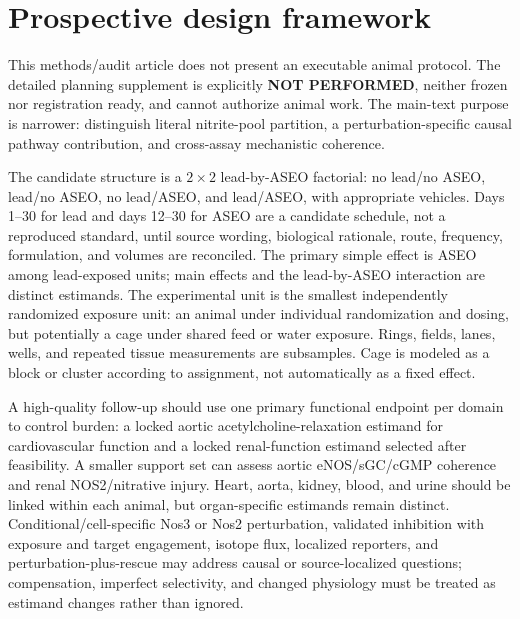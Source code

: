 \documentclass[11pt]{article}
\begin{document}
\section{Prospective design framework}

This methods/audit article does not present an executable animal protocol. The detailed planning supplement is explicitly \textbf{NOT PERFORMED}, neither frozen nor registration ready, and cannot authorize animal work. The main-text purpose is narrower: distinguish literal nitrite-pool partition, a perturbation-specific causal pathway contribution, and cross-assay mechanistic coherence.

The candidate structure is a $2\times2$ lead-by-ASEO factorial: no lead/no ASEO, lead/no ASEO, no lead/ASEO, and lead/ASEO, with appropriate vehicles. Days 1--30 for lead and days 12--30 for ASEO are a candidate schedule, not a reproduced standard, until source wording, biological rationale, route, frequency, formulation, and volumes are reconciled. The primary simple effect is ASEO among lead-exposed units; main effects and the lead-by-ASEO interaction are distinct estimands. The experimental unit is the smallest independently randomized exposure unit: an animal under individual randomization and dosing, but potentially a cage under shared feed or water exposure. Rings, fields, lanes, wells, and repeated tissue measurements are subsamples. Cage is modeled as a block or cluster according to assignment, not automatically as a fixed effect.

A high-quality follow-up should use one primary functional endpoint per domain to control burden: a locked aortic acetylcholine-relaxation estimand for cardiovascular function and a locked renal-function estimand selected after feasibility. A smaller support set can assess aortic eNOS/sGC/cGMP coherence and renal NOS2/nitrative injury. Heart, aorta, kidney, blood, and urine should be linked within each animal, but organ-specific estimands remain distinct. Conditional/cell-specific Nos3 or Nos2 perturbation, validated inhibition with exposure and target engagement, isotope flux, localized reporters, and perturbation-plus-rescue may address causal or source-localized questions; compensation, imperfect selectivity, and changed physiology must be treated as estimand changes rather than ignored.
\end{document}

